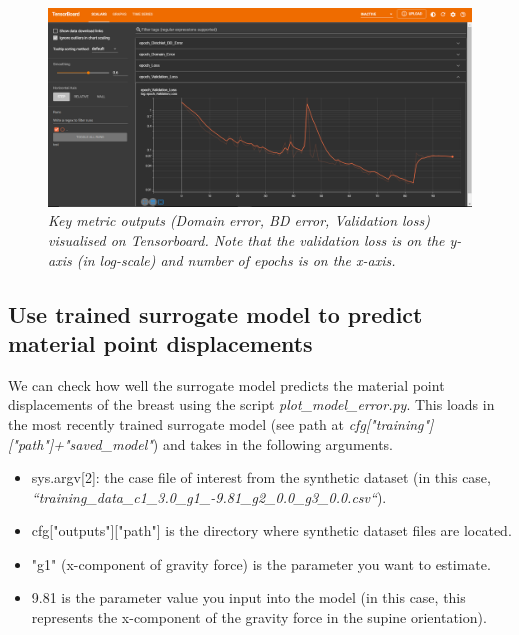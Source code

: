 \documentclass[11pt]{article}
\begin{document}
\begin{figure}
\centering
\includegraphics[scale=1.1]{Images/breast/surrogate_model/tensorboard.png}
\caption{\textit{\label{fig7}Key metric outputs (Domain error, BD error, Validation loss) visualised on Tensorboard. Note that the validation loss is on the y-axis (in log-scale) and number of epochs is on the x-axis.}}
\end{figure}

\subsection{Use trained surrogate model to predict material point displacements}
We can check how well the surrogate model predicts the material point displacements of the breast using the script \textit{plot\_model\_error.py}. This loads in the most recently trained surrogate model (see path at \textit{cfg["training"]["path"]+"saved\_model"}) and takes in the following arguments.
\begin{itemize}
    \item sys.argv[2]: the case file of interest from the synthetic dataset (in this case, \textit{``training\_data\_c1\_3.0\_g1\_-9.81\_g2\_0.0\_g3\_0.0.csv``}).
    \item cfg["outputs"]["path"] is the directory where synthetic dataset files are located. 
    \item "g1" (x-component of gravity force) is the parameter you want to estimate. 
    \item 9.81 is the parameter value you input into the model (in this case, this represents the x-component of the gravity force in the supine orientation).
\end{itemize}
\newline
\end{document}
